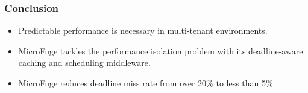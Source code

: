 \documentclass{beamer}
\begin{document}

\begin{frame}
  \frametitle{Conclusion}
  \begin{itemize}
  \item Predictable performance is necessary in multi-tenant environments.
  \item MicroFuge tackles the performance isolation problem with its
    deadline-aware caching and scheduling middleware.
  \item MicroFuge reduces deadline miss rate from over 20\% to
    less than 5\%.
  \end{itemize}
\end{frame}
\end{document}
